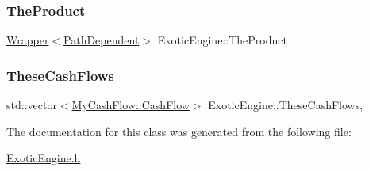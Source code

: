 \hypertarget{classExoticEngine_a16475790e675a12ac23a01d81c5557de}{}\label{classExoticEngine_a16475790e675a12ac23a01d81c5557de} 
\subsubsection{\texorpdfstring{The\+Product}{TheProduct}}
{\footnotesize\ttfamily \hyperlink{classWrapper}{Wrapper}$<$\hyperlink{classPathDependent}{Path\+Dependent}$>$ Exotic\+Engine\+::\+The\+Product\hspace{0.3cm}{\ttfamily [protected]}}

\hypertarget{classExoticEngine_af4c36f88d17b753e174b6db02bade7e6}{}\label{classExoticEngine_af4c36f88d17b753e174b6db02bade7e6} 
\subsubsection{\texorpdfstring{These\+Cash\+Flows}{TheseCashFlows}}
{\footnotesize\ttfamily std\+::vector$<$\hyperlink{classMyCashFlow_1_1CashFlow}{My\+Cash\+Flow\+::\+Cash\+Flow}$>$ Exotic\+Engine\+::\+These\+Cash\+Flows\hspace{0.3cm}{\ttfamily [mutable]}, {\ttfamily [protected]}}



The documentation for this class was generated from the following file\+:\begin{DoxyCompactItemize}
\item 
\hyperlink{ExoticEngine_8h}{Exotic\+Engine.\+h}\end{DoxyCompactItemize}
